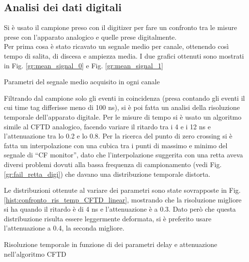 \subsection{Analisi dei dati digitali}
Si è usato il campione preso con il digitizer per fare un confronto tra le misure prese con l'apparato analogico e quelle prese digitalmente.\\
Per prima cosa è stato ricavato un segnale medio per canale, ottenendo così tempo di salita, di discesa e ampiezza media. I due grafici ottenuti sono mostrati in Fig. \ref{gr:mean_signal_0} e Fig. \ref{gr:mean_signal_1}




\begin{tabella}[h]
	\centering
	
	\caption{Parametri del segnale medio acquisito in ogni canale}
	\label{tab:signal_shape}
\end{tabella}

Filtrando dal campione solo gli eventi in coincidenza (presa contando gli eventi il cui time tag differisse meno di 100 ns), si è poi fatta un analisi della risoluzione temporale dell'apparato digitale. Per le misure di tempo si è usato un algoritmo simile al CFTD analogico, facendo variare il ritardo tra i 4 e i 12 ns e l'attenuazione tra lo 0.2 e lo 0.8. Per la ricerca del punto di zero crossing si è fatta un interpolazione con una cubica tra i punti di massimo e minimo del segnale di ``CF monitor'', dato che l'interpolazione suggerita con una retta aveva diversi problemi dovuti alla bassa frequenza di campionamento (vedi Fig. \ref{gr:fail_retta_digi}) che davano una distribuzione temporale distorta.



Le distribuzioni ottenute al variare dei parametri sono state sovrapposte in Fig. \ref{hist:confronto_ris_temp_CFTD_linear}, mostrando che la risoluzione migliore si ha quando il ritardo è di 4 ns e l'attenuazione è a 0.3. Dato però che questa distribuzione risulta essere leggermente deformata, si è preferito usare l'attenuazione a 0.4, la seconda migliore.



\begin{tabella}[h]
	\centering
	
	\caption{Risoluzione temporale in funzione di dei parametri delay e attenuazione nell'algoritmo CFTD}
	\label{tab:cftd_fwhm_digi}
\end{tabella}

